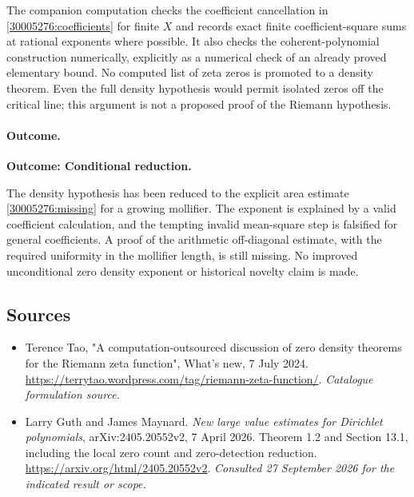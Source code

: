 \documentclass[11pt,a4paper]{article}
\numberwithin{equation}{section}
\begin{document}
The companion computation checks the coefficient cancellation in
\eqref{30005276:coefficients} for finite $X$ and records exact finite
coefficient-square sums at rational exponents where possible.  It also
checks the coherent-polynomial construction numerically, explicitly as
a numerical check of an already proved elementary bound.  No computed
list of zeta zeros is promoted to a density theorem.  Even the full
density hypothesis would permit isolated zeros off the critical line;
this argument is not a proposed proof of the Riemann hypothesis.

\paragraph{Outcome.}
\textbf{Outcome: Conditional reduction.}

The density hypothesis has been reduced to the explicit area estimate
\eqref{30005276:missing} for a growing mollifier.  The exponent is explained
by a valid coefficient calculation, and the tempting invalid
mean-square step is falsified for general coefficients.  A proof of the
arithmetic off-diagonal estimate, with the required uniformity in the
mollifier length, is still missing.  No improved unconditional zero
density exponent or historical novelty claim is made.
\subsection{Sources}
\begin{itemize}\raggedright
\item[\textnormal{[S1]}]\hypertarget{source:30005276:1}{} Terence Tao, "A computation-outsourced discussion of zero density theorems for the Riemann zeta function", What's new, 7 July 2024.
\url{https://terrytao.wordpress.com/tag/riemann-zeta-function/}.
{\small\textit{Catalogue formulation source.}}
\item[\textnormal{[E1]}]\hypertarget{extra:30005276:1}{} Larry Guth and James Maynard.
\emph{New large value estimates for Dirichlet polynomials}, arXiv:2405.20552v2, 7 April 2026. Theorem 1.2 and Section 13.1, including the local zero count and zero-detection reduction.
\url{https://arxiv.org/html/2405.20552v2}.
{\small\textit{Consulted 27 September 2026 for the indicated result or scope.}}
\end{itemize}
\end{document}

